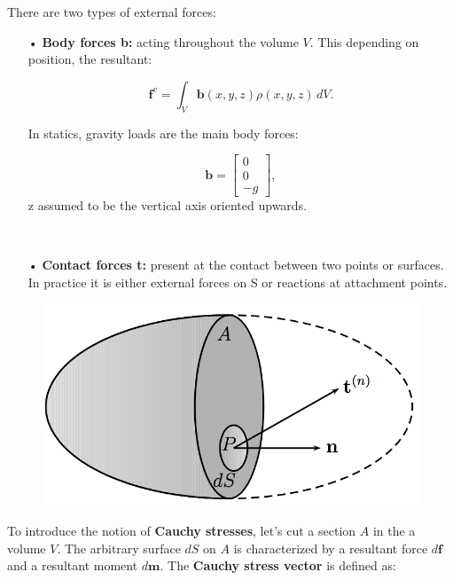 		There are two types of external forces: 
		\begin{itemize}
			\item[•] \textbf{Body forces b:} acting throughout the volume $V$. This depending on position, the resultant:
			
			\begin{equation}
				\mathbf{f}^v = \int _V \mathbf{b}(x,y,z) \rho (x,y,z)\, dV.
			\end{equation}
			
			In statics, gravity loads are the main body forces: 
			
			\begin{equation}
			\mathbf{b} = \left[
			\begin{array}{c}
			0\\
			0\\
			- g
			\end{array}
			 \right],
			\end{equation}
			z assumed to be the vertical axis oriented upwards. 
			
		\	\item[•] \textbf{Contact forces t:} present at the contact between two points or surfaces. In practice it is either external forces on S or reactions at attachment points. 
		\end{itemize}
		
		\begin{figure}
		\vspace{-5mm}	
		\includegraphics[scale=0.3]{ch3/2}
		\end{figure}		
		To introduce the notion of \textbf{Cauchy stresses}, let's cut a section $A$ in the a volume $V$. The arbitrary surface $dS$ on $A$ is characterized by a resultant force $d\mathbf{f}$ and a resultant moment $d\mathbf{m}$. The \textbf{Cauchy stress vector} is defined as: 
		
